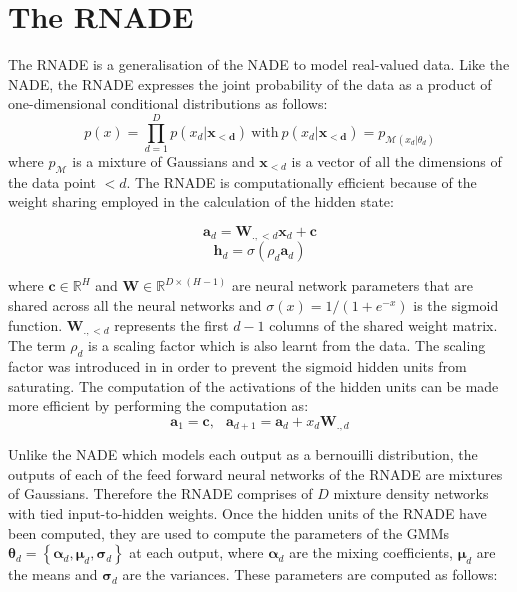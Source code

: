 \documentclass{article} %
\begin{document}
\section{The RNADE}
\label{RNADE}

The RNADE is a generalisation of the NADE to model real-valued data. Like the NADE, the RNADE expresses the joint probability of the data as a product of one-dimensional conditional distributions as follows:
$$ p(x) = \prod_{d=1}^{D} p(x_d|\mathbf{x_{<d}}) \: \text{with} \: p(x_d|\mathbf{x_{<d}}) = p_{\mathcal{M}(x_d|\theta_d)} $$ where $p_{\mathcal{M}}$ is a mixture of Gaussians and $\boldsymbol{x}_{<d}$ is a vector of all the dimensions of the data point $<d$. The RNADE is computationally efficient because of the weight sharing employed in the calculation of the hidden state: %

$$ \mathbf{a}_d = \boldsymbol{W}_{.,<d}\boldsymbol{x}_d + \mathbf{c}$$
$$ \boldsymbol{h}_d = \sigma (\rho_d \mathbf{a}_d)$$


where $\mathbf{c} \in \mathbb{R}^{H}$ and $\boldsymbol{W} \in \mathbb{R}^{D \times (H-1)}$ are neural network parameters that are shared across all the neural networks and $\sigma(x) = 1/(1+e^{-x})$ is the sigmoid function. $\boldsymbol{W}_{.,<d}$ represents the first $d-1$ columns of the shared weight matrix. The term $\rho_d$ is a scaling factor which is also learnt from the data. The scaling factor was introduced in \cite{AISTATS2011_Bengio11} in order to prevent the sigmoid hidden units from saturating. The computation of the activations of the hidden units can be made more efficient by performing the computation as:
$$ \mathbf{a}_1 = \mathbf{c}, \: \: \; \mathbf{a}_{d+1} = \mathbf{a}_{d} + x_d \mathbf{W}_{.,d}$$

 Unlike the NADE which models each output as a bernouilli distribution, the outputs of each of the feed forward neural networks of the RNADE are mixtures of Gaussians. Therefore the RNADE comprises of $D$ mixture density networks with tied input-to-hidden weights. Once the hidden units of the RNADE have been computed, they are used to compute the parameters of the GMMs $\boldsymbol{\theta}_d  = \left\{ \boldsymbol{\alpha}_d, \boldsymbol{\mu}_d, \boldsymbol{\sigma}_d \right\}$ at each output, where $\boldsymbol{\alpha}_d$ are the mixing coefficients, $\boldsymbol{\mu}_d$ are the means and $\boldsymbol{\sigma}_d$ are the variances. These parameters are computed as follows:
\end{document}
